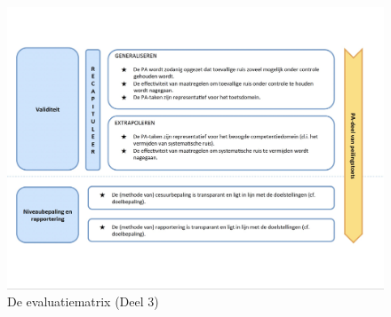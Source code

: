 \documentclass[
  letterpaper,
]{report}
\begin{document}
\begin{figure}

{\centering \includegraphics{./FIG10_3.jpg}

}

\caption{\label{fig-figuur10_3}De evaluatiematrix (Deel 3)}

\end{figure}
\end{document}
